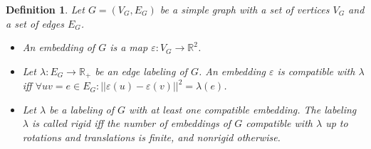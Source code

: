 \documentclass[a1paper, portrait, margin=0mm, innermargin=15mm, blockverticalspace=15mm, colspace=15mm, subcolspace=-5mm]{tikzposter} %
\newtheorem{defn}{Definition}
\newcommand{\RR}{\mathbb{R}}
\begin{document}
\begin{columns}
{\begin{defn}
Let $G=(V_G,E_G)$ be a simple graph with a set of vertices $V_G$ and a set of edges $E_G$. 
\begin{itemize}
	\item An \emph{embedding} of $G$ is a map $\varepsilon:V_G\rightarrow \RR^2$. 
	\item  Let $\lambda:E_G\rightarrow \RR_+$ be an edge labeling of $G$. An embedding $\varepsilon$ is \emph{compatible with} $\lambda$ iff $\forall uv=e\in E_G \colon ||\varepsilon(u)-\varepsilon(v)||^2=\lambda(e)$.
	\item Let $\lambda$ be a labeling of $G$ with at least one compatible embedding. The labeling $\lambda$ is called \emph{rigid} iff the number of embeddings of $G$ compatible with $\lambda$ up to rotations and translations is finite, and \emph{nonrigid} otherwise.
\end{itemize} 
\end{defn}


}
\end{columns}
\end{document}
